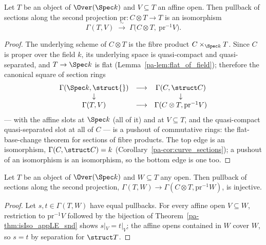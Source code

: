 \begin{theorem}
  \label{pa-thm:isIso_appLE_snd}
  \leanok

  Let \(T\) be an object of \(\Over(\Spec k)\) and \(V \subseteq T\) an affine open. Then
  pullback of sections along the second projection
  \(\mathrm{pr} \colon C \otimes T \to T\) is an isomorphism
  \[ \Gamma(T, V) \;\xrightarrow{\ \sim\ }\; \Gamma\bigl(C \otimes T,\
     \mathrm{pr}^{-1}V\bigr). \]
\end{theorem}
\begin{proof}
  \leanok
  The underlying scheme of \(C \otimes T\) is the fibre product
  \(C \times_{\Spec k} T\). Since \(C\) is proper over the field \(k\), its underlying space
  is quasi-compact and quasi-separated, and \(T \to \Spec k\) is flat
  (Lemma~\ref{pa-lem:flat_of_field}); therefore the canonical square of section rings
  \[ \begin{array}{ccc}
     \Gamma(\Spec k, \struct{}) & \longrightarrow & \Gamma(C, \struct C) \\
     \downarrow & & \downarrow \\
     \Gamma(T, V) & \longrightarrow & \Gamma(C \otimes T, \mathrm{pr}^{-1}V)
     \end{array} \]
  --- with the affine slots at \(\Spec k\) (all of it) and at \(V \subseteq T\), and the
  quasi-compact quasi-separated slot at all of \(C\) --- is a pushout of commutative rings:
  the flat-base-change theorem for sections of fibre products. The top edge is an
  isomorphism, \(\Gamma(C, \struct C) = k\) (Corollary~\ref{pa-cor:curve_sections}); a pushout
  of an isomorphism is an isomorphism, so the bottom edge is one too.
\end{proof}

\begin{corollary}
  \label{pa-cor:appLE_snd_injective}
  \leanok

  Let \(T\) be an object of \(\Over(\Spec k)\) and \(W \subseteq T\) any open. Then pullback
  of sections along the second projection,
  \(\Gamma(T, W) \to \Gamma(C \otimes T, \mathrm{pr}^{-1}W)\), is injective.
\end{corollary}
\begin{proof}
  \leanok
  Let \(s, t \in \Gamma(T,W)\) have equal pullbacks. For every affine open \(V \subseteq W\),
  restriction to \(\mathrm{pr}^{-1}V\) followed by the bijection of
  Theorem~\ref{pa-thm:isIso_appLE_snd} shows \(s|_V = t|_V\); the affine opens contained in
  \(W\) cover \(W\), so \(s = t\) by separation for \(\struct T\).
\end{proof}


